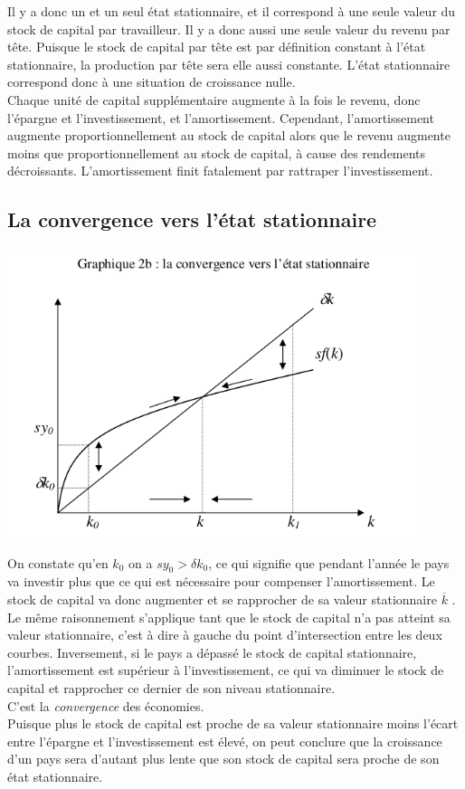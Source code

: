 \documentclass[10pt]{book}
\begin{document}
Il y a donc un et un seul état stationnaire, et il correspond à une seule valeur du stock de capital par travailleur. Il y a donc aussi une seule valeur du revenu par tête. Puisque le stock de capital par tête est par définition constant à l'état stationnaire, la production par tête sera elle aussi constante. L'état stationnaire correspond donc à une situation de croissance nulle. \\
Chaque unité de capital supplémentaire augmente à la fois le revenu, donc l'épargne et l'investissement, et l'amortissement. Cependant, l'amortissement augmente proportionnellement au stock de capital alors que le revenu augmente moins que proportionnellement au stock de capital, à cause des rendements décroissants. L'amortissement finit fatalement par rattraper l'investissement.
\subsection{La convergence vers l'état stationnaire} 
\begin{center}
  \includegraphics[width=12cm]{graph2b.png}
\end{center}
On constate qu'en $k_0$ on a $sy_0 > \delta k_0$, ce qui signifie que pendant l'année le pays va investir plus que ce qui est nécessaire pour compenser l'amortissement. Le stock de capital va donc augmenter et se rapprocher de sa valeur stationnaire $\overline{k}$ . Le même raisonnement s'applique tant que le stock de capital n'a pas atteint sa valeur stationnaire, c'est à dire à gauche du point d'intersection entre les deux courbes. Inversement,  si le pays a dépassé le stock de capital stationnaire, l'amortissement est supérieur à l'investissement, ce qui va diminuer le stock de capital et rapprocher ce dernier de son niveau stationnaire. \\
C'est la \textit{convergence} des économies. \\
Puisque plus le stock de capital est proche de sa valeur stationnaire moins l'écart entre l'épargne et l'investissement est élevé, on peut conclure que la croissance d'un pays sera d'autant plus lente que son stock de capital sera proche de son état stationnaire.
\end{document}
